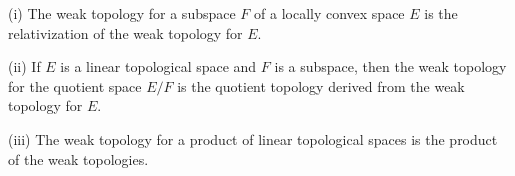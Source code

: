 (i) The weak topology for a subspace $F$ of a locally convex space $E$ is the relativization of the weak topology for $E$.

(ii) If $E$ is a linear topological space and $F$ is a subspace, then the weak topology for the quotient space $E/F$ is the quotient topology derived from the weak topology for $E$.

(iii) The weak topology for a product of linear topological spaces is the product of the weak topologies.
